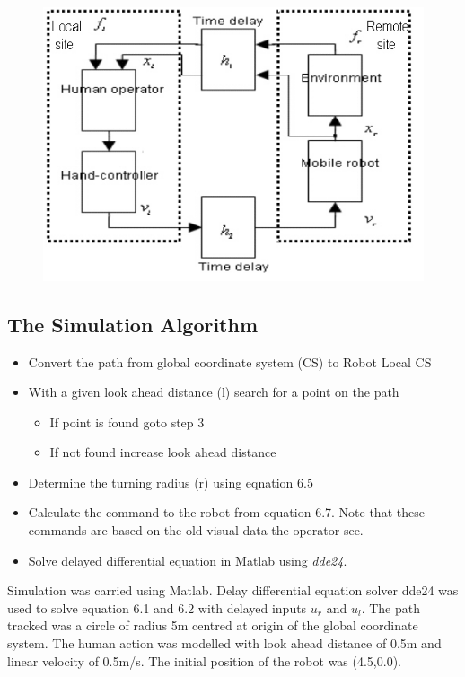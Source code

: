 \begin{figure}
	\includegraphics[width=\linewidth,keepaspectratio]{Chapter6/fig/teleloop}
	\label{fig:teleloop} 
\end{figure}


\subsection{The Simulation Algorithm} 
\begin{itemize}
\item Convert the path from global coordinate system (CS) to Robot Local CS
\item With a given look ahead distance (l) search for a point on the path
\begin{itemize}
\item If point is found goto step 3
\item If not found increase look ahead distance 
\end{itemize}
\item Determine the turning radius (r) using eqnation 6.5
\item Calculate the command to the robot from equation 6.7. Note that these commands are based on the old visual data the operator see.
\item Solve delayed  differential equation in Matlab using \textit{ dde24}.
\end{itemize}

Simulation was carried using Matlab. Delay differential equation solver dde24 was used to solve equation 6.1 and 6.2 with delayed inputs $u_r$ and $u_l$.  The path  tracked was a circle of radius 5m centred at origin of the global coordinate system. The human action was modelled with look ahead distance of 0.5m and linear velocity of 0.5m/s. The initial position of the robot was (4.5,0.0).

